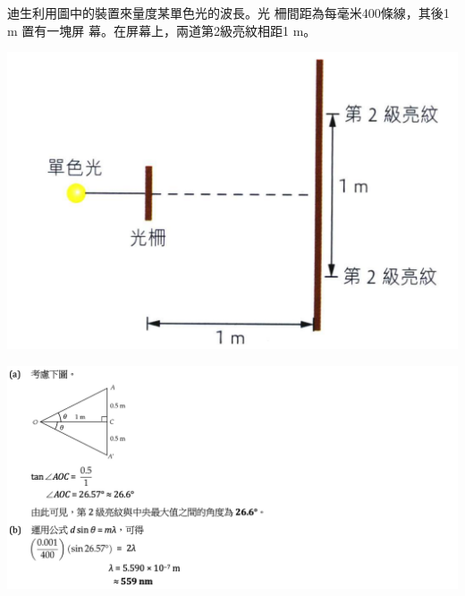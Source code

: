 {
    迪生利用圖中的裝置來量度某單色光的波長。光 柵間距為每毫米400條線，其後1 m 置有一塊屏 幕。在屏幕上，兩道第2級亮紋相距1 m。
    \par{\par\centering\includegraphics[width=.4\textwidth]{./img/ch4_earlyclass_wave_lq_2024-05-14-14-06-10.png}\par}
    \clearpage
}{
    \sol\par{\par\centering\includegraphics[width=\textwidth]{./img/ch4_earlyclass_wave_lq_2024-05-14-14-07-38.png}\par}
}
